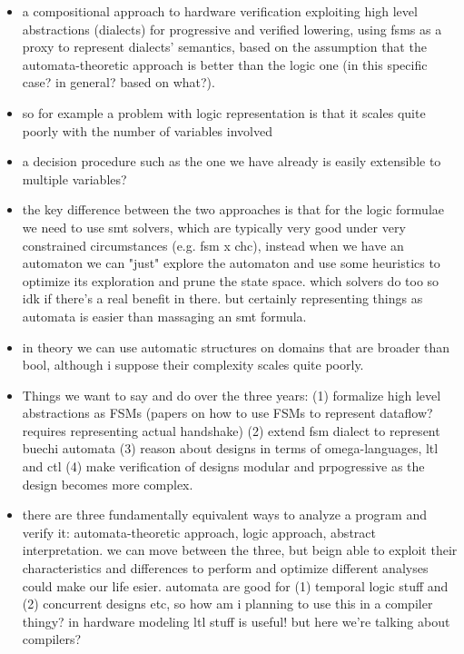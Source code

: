 \documentclass[]{article}
\begin{document}
\begin{itemize}
    \item a compositional approach to hardware verification exploiting high level abstractions (dialects)
        for progressive and verified lowering, using fsms as a proxy to represent dialects' semantics, 
        based on the assumption that the automata-theoretic approach is better than the logic one (in this specific case? in general? based on what?).
    \item so for example a problem with logic representation is that it scales quite poorly with the number of variables involved
    \item a decision procedure such as the one we have already is easily extensible to multiple variables? 
    \item the key difference between the two approaches is that for the logic formulae we need to use smt solvers, which are typically very good under 
        very constrained circumstances (e.g. fsm x chc), instead when we have an automaton we can "just" explore the automaton and use some 
        heuristics to optimize its exploration and prune the state space. which solvers do too so idk if there's a real benefit in there. 
        but certainly representing things as automata is easier than massaging an smt formula. 
    \item in theory we can use automatic structures on domains that are broader than bool, although i suppose their complexity scales quite poorly. 
    \item Things we want to say and do over the three years: 
        (1) formalize high level abstractions as FSMs (papers on how to use FSMs to represent dataflow? requires representing actual handshake)
        (2) extend fsm dialect to represent buechi automata 
        (3) reason about designs in terms of omega-languages, ltl and ctl
        (4) make verification of designs modular and prpogressive as the design becomes more complex.
    \item there are three fundamentally equivalent ways to analyze a program and verify it: automata-theoretic approach, logic approach, abstract interpretation. 
        we can move between the three, but beign able to exploit their characteristics and differences to perform and optimize different analyses could make our life esier. 
        automata are good for (1) temporal logic stuff and (2) concurrent designs etc, so how am i planning to use this in a compiler thingy? 
        in hardware modeling ltl stuff is useful! but here we're talking about compilers? 
\end{itemize}
\end{document}
